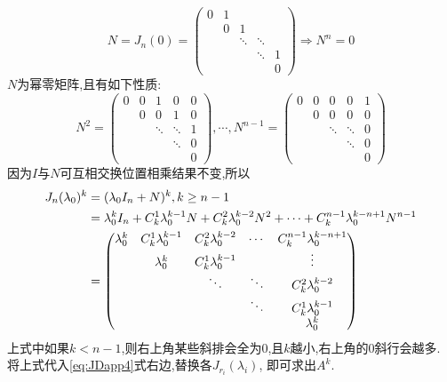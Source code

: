 \begin{solution}
    \begin{equation}\label{eq:JDapp6}
      N=J_n(0)=
      \begin{pmatrix}
        0&1&&&\\
         &0&1&&\\
         &&\ddots&\ddots&\\
         &&&\ddots&1\\
        &&&&0
      \end{pmatrix} \Longrightarrow N^n = 0
    \end{equation}
    $N$为幂零矩阵,且有如下性质:
    \begin{equation}\label{eq:JDapp7}
      N^2 =
      \begin{pmatrix}
         0&0&1&0&0\\
         &0&0&1&0\\
         &&\ddots&\ddots&1\\
         &&&\ddots&0\\
        &&&&0
      \end{pmatrix}, \cdots, N^{n-1} =
      \begin{pmatrix}
         0&0&0&0&1\\
         &0&0&0&0\\
         &&\ddots&\ddots&0\\
         &&&\ddots&0\\
        &&&&0
      \end{pmatrix}
    \end{equation}
    因为$I$与$N$可互相交换位置相乘结果不变,所以
    \begin{align}
      J_n(\lambda_0)^k & = (\lambda_0 I_n +N)^k, k \geq n-1 \notag\\
                       & = \lambda_0^k I_n+C_k^1\lambda_0^{k-1}N +
                         C_k^2\lambda_0^{k-2}N^2+\cdots+C_k^{n-1}\lambda_0^{k-n+1}N^{n-1} \notag\\
                       & = \begin{pmatrix}\label{eq:JDapp8}
                           \lambda_0^k&C_k^1\lambda_0^{k-1}&C_k^2\lambda_0^{k-2}&\cdots&C_k^{n-1}\lambda_0^{k-n+1}\\
                                      &\lambda_0^k&C_k^1\lambda_0^{k-1}&&\vdots\\
                                      &&\ddots&\ddots&C_k^2\lambda_0^{k-2}\\
                                      &&&\ddots&C_k^1\lambda_0^{k-1}\\
                           &&&&\lambda_0^k
                         \end{pmatrix}
    \end{align}
    上式中如果$k < n-1$,则右上角某些斜排会全为$0$,且$k$越小,右上角的$0$斜行会越多.
    将上式代入\eqref{eq:JDapp4}式右边,替换各$J_{r_i}(\lambda_i)$,
    即可求出$A^k$.
  \end{solution}


